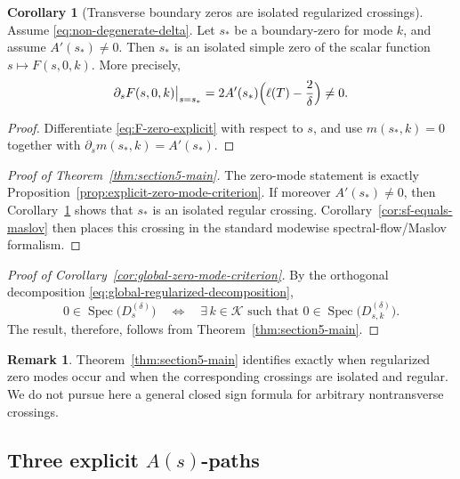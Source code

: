 \documentclass[11pt]{article}
\theoremstyle{definition}
\newtheorem{corollary}[theorem]{Corollary}
\newtheorem{remark}[remark]{Remark}
\DeclareMathOperator{\Spec}{Spec}
\numberwithin{equation}{section}
\begin{document}
\begin{corollary}[Transverse boundary zeros are isolated regularized crossings]
\label{cor:transverse-boundary-zeros}
Assume \eqref{eq:non-degenerate-delta}. Let \(s_*\) be a boundary-zero for mode \(k\), and assume \(A'(s_*)\neq 0\). Then \(s_*\) is an isolated simple zero of the scalar function \(s\mapsto F(s,0,k)\). More precisely,
\begin{equation}
\partial_s F(s,0,k)\big|_{s=s_*}
=
2A'(s_*)\Bigl(\ell(T)-\frac{2}{\delta}\Bigr)\neq 0.
\end{equation}
\end{corollary}

\begin{proof}
Differentiate \eqref{eq:F-zero-explicit} with respect to \(s\), and use \(m(s_*,k)=0\) together with \(\partial_s m(s_*,k)=A'(s_*)\).
\end{proof}

\begin{proof}[Proof of Theorem~\ref{thm:section5-main}]
The zero-mode statement is exactly Proposition~\ref{prop:explicit-zero-mode-criterion}. If moreover \(A'(s_*)\neq 0\), then Corollary~\ref{cor:transverse-boundary-zeros} shows that \(s_*\) is an isolated regular crossing. Corollary~\ref{cor:sf-equals-maslov} then places this crossing in the standard modewise spectral-flow/Maslov formalism.
\end{proof}

\begin{proof}[Proof of Corollary~\ref{cor:global-zero-mode-criterion}]
By the orthogonal decomposition \eqref{eq:global-regularized-decomposition},
\begin{equation}
0\in\Spec\bigl(D^{(\delta)}_{s}\bigr)
\quad\Longleftrightarrow\quad
\exists\,k\in\mathcal K \text{ such that } 0\in\Spec\bigl(D^{(\delta)}_{s,k}\bigr).
\end{equation}
The result, therefore, follows from Theorem~\ref{thm:section5-main}.
\end{proof}

\begin{remark}
Theorem~\ref{thm:section5-main} identifies exactly when regularized zero modes occur and when the corresponding crossings are isolated and regular. We do not pursue here a general closed sign formula for arbitrary nontransverse crossings.
\end{remark}

\subsection{Three explicit \(A(s)\)-paths}\label{subsec:three_examples_maslov}
\end{document}

